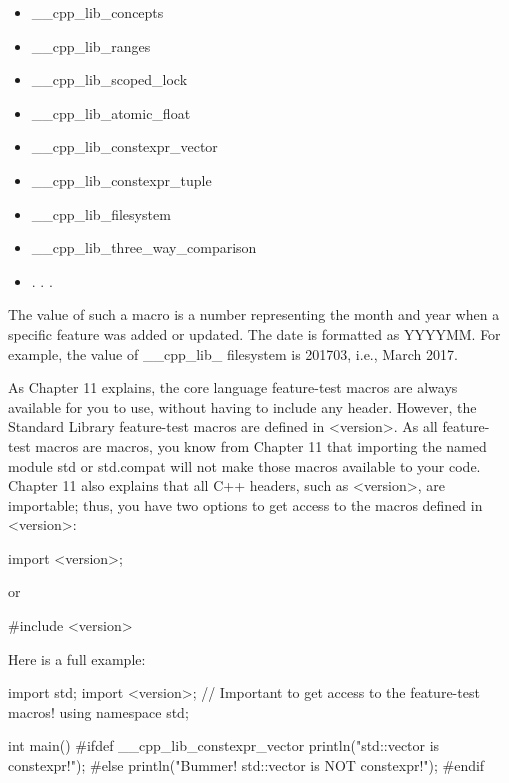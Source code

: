 \begin{itemize}
\item
\_\_cpp\_lib\_concepts

\item
\_\_cpp\_lib\_ranges

\item
\_\_cpp\_lib\_scoped\_lock


\item
\_\_cpp\_lib\_atomic\_float

\item
\_\_cpp\_lib\_constexpr\_vector


\item
\_\_cpp\_lib\_constexpr\_tuple

\item
\_\_cpp\_lib\_filesystem

\item
\_\_cpp\_lib\_three\_way\_comparison

\item
. . .
\end{itemize}

The value of such a macro is a number representing the month and year when a specific feature was added or updated. The date is formatted as YYYYMM. For example, the value of \_\_cpp\_lib\_ filesystem is 201703, i.e., March 2017.

As Chapter 11 explains, the core language feature-test macros are always available for you to use, without having to include any header. However, the Standard Library feature-test macros are defined in <version>. As all feature-test macros are macros, you know from Chapter 11 that importing the named module std or std.compat will not make those macros available to your code. Chapter 11 also explains that all C++ headers, such as <version>, are importable; thus, you have two options to get access to the macros defined in <version>:

\begin{cpp}
import <version>;
\end{cpp}

or

\begin{cpp}
#include <version>
\end{cpp}

Here is a full example:

\begin{cpp}
import std;
import <version>; // Important to get access to the feature-test macros!
using namespace std;

int main()
{
#ifdef __cpp_lib_constexpr_vector
    println("std::vector is constexpr!");
#else
    println("Bummer! std::vector is NOT constexpr!");
#endif
}
\end{cpp}

